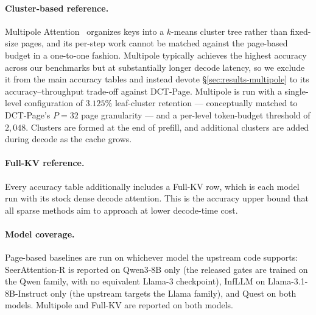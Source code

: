 \paragraph{Cluster-based reference.}
Multipole Attention~\cite{hooper2025multipole} organizes keys into a
$k$-means cluster tree rather than fixed-size pages, and its per-step
work cannot be matched against the page-based budget in a one-to-one
fashion.  Multipole typically achieves the highest accuracy across
our benchmarks but at substantially longer decode latency, so we
exclude it from the main accuracy tables and instead devote
\S\ref{sec:results-multipole} to its accuracy--throughput trade-off
against DCT-Page.  Multipole is run with a single-level
configuration of $3.125\%$ leaf-cluster retention --- conceptually
matched to DCT-Page's $P{=}32$ page granularity --- and a per-level
token-budget threshold of $2{,}048$.  Clusters are formed at the end
of prefill, and additional clusters are added during decode as the
cache grows.

\paragraph{Full-KV reference.}
Every accuracy table additionally includes a Full-KV row, which is
each model run with its stock dense decode attention.  This is the
accuracy upper bound that all sparse methods aim to approach at
lower decode-time cost.

\paragraph{Model coverage.}
Page-based baselines are run on whichever model the upstream code
supports: SeerAttention-R is reported on Qwen3-8B only (the released
gates are trained on the Qwen family, with no equivalent
Llama-3 checkpoint), InfLLM on Llama-3.1-8B-Instruct only (the
upstream targets the Llama family), and Quest on both models.
Multipole and Full-KV are reported on both models.

